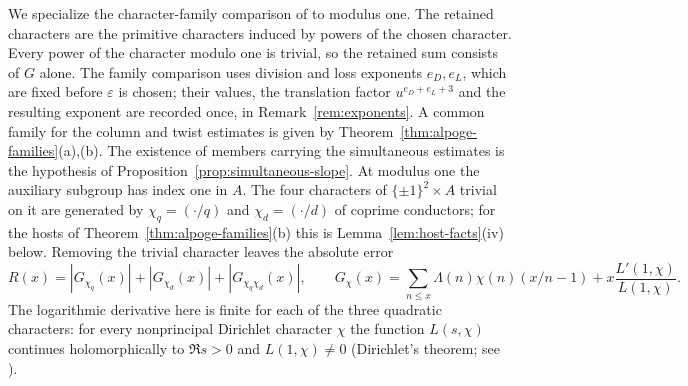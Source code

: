 \documentclass[10pt]{amsart}
\theoremstyle{definition}
\theoremstyle{remark}
\begin{document}
We specialize the character-family comparison of \cite{CharacterFamily}
to modulus one. The retained characters are the primitive characters
induced by powers of the chosen character. Every power of the
character modulo one is trivial, so the retained sum consists of
$G$ alone. The family comparison uses division and loss exponents $e_D,e_L$, which
are fixed before $\varepsilon$ is chosen; their values, the translation
factor $u^{e_D+e_L+3}$ and the resulting exponent are recorded once, in
Remark~\ref{rem:exponents}. A common family for the column and twist
estimates is given by Theorem~\ref{thm:alpoge-families}(a),(b). The
existence of members carrying the simultaneous estimates is the hypothesis
of Proposition~\ref{prop:simultaneous-slope}.
At modulus one the auxiliary subgroup has index one in $A$. The four
characters of $\{\pm1\}^2\times A$ trivial on it are generated by
$\chi_q=(\cdot/q)$ and $\chi_d=(\cdot/d)$ of coprime conductors; for the
hosts of Theorem~\ref{thm:alpoge-families}(b) this is
Lemma~\ref{lem:host-facts}(iv) below.
Removing the trivial character leaves the absolute error
\[
 R(x)=|G_{\chi_q}(x)|+|G_{\chi_d}(x)|+|G_{\chi_q\chi_d}(x)|,
 \qquad
 G_\chi(x)=\sum_{n\le x}\Lambda(n)\chi(n)(x/n-1)
             +x\frac{L'(1,\chi)}{L(1,\chi)} .
\]
The logarithmic derivative here is finite for each of the three
quadratic characters: for every nonprincipal Dirichlet character $\chi$ the
function $L(s,\chi)$ continues holomorphically to $\Re s>0$ and
$L(1,\chi)\ne0$ (Dirichlet's theorem; see \cite[Chapter~4]{Davenport}).
\end{document}
